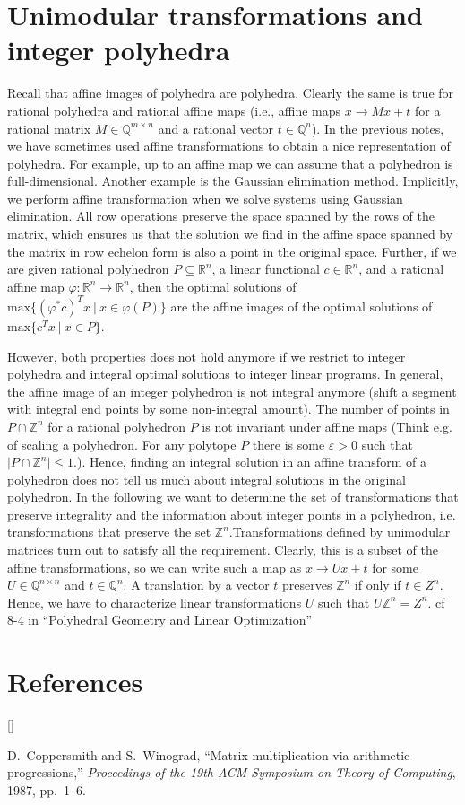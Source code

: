 \documentclass{article}
\def\beginrefs{\begin{list}%
        {[\arabic{equation}]}{\usecounter{equation}
         \setlength{\leftmargin}{2.0truecm}\setlength{\labelsep}{0.4truecm}%
         \setlength{\labelwidth}{1.6truecm}}}
\def\endrefs{\end{list}}
\def\bibentry#1{\item[\hbox{[#1]}]}
\def\R{{\mathbb R}}
\def\Q{{\mathbb Q}}
\def\Z{{\mathbb Z}}
\begin{document}
\section{Unimodular transformations and integer polyhedra}
Recall that affine images of polyhedra are polyhedra. Clearly the same is true for rational polyhedra and rational affine maps (i.e., affine maps $x\rightarrow Mx+t$ for a rational matrix $M\in\Q^{m\times n}$ and a rational vector $t\in \Q^n$). In the previous notes, we have sometimes used affine transformations to obtain a nice representation of polyhedra. For example, up to an affine map we can assume that a polyhedron is full-dimensional. Another example is the Gaussian elimination method. Implicitly, we perform affine transformation when we solve systems using Gaussian elimination. All row operations preserve the space spanned by the rows of the matrix, which ensures us that the solution we find in the affine space spanned by the matrix in row echelon form is also a point in the original space. Further, if we are given rational polyhedron $P\subseteq\R^n$, a linear functional $c\in \R^n$, and a rational affine map $\varphi:\R^n\rightarrow \R^n$, then the optimal solutions of $\mbox{max}\{(\varphi^* c)^T x~|~x\in \varphi(P)\}$ are the affine images of the optimal solutions of $\mbox{max}\{c^T x~|~x\in P\}$. 

However, both properties does not hold anymore if we restrict to integer polyhedra and 
integral optimal solutions to integer linear programs. In general, the affine image of an integer polyhedron is not integral anymore (shift a segment with integral end points by some non-integral amount). The number of points in $P\cap \Z^n$ for a rational polyhedron $P$ is not invariant under affine maps (Think e.g. of scaling a polyhedron. For any polytope $P$ there is some $\varepsilon>0$ such that $\lvert P\cap \Z^n \rvert\leqslant 1$.). Hence, finding an integral solution in an affine transform of a polyhedron does not tell us much about integral solutions in the original polyhedron. In the following we want to determine the set of transformations that preserve integrality and the information about integer points in a polyhedron, i.e. transformations that preserve the set $\Z^n$.Transformations defined by unimodular matrices turn out to satisfy all the requirement. Clearly, this is a subset of the affine transformations, so we can write such a map as $x\rightarrow Ux+t$ for some $U\in\Q^{n\times n}$ and $t\in \Q^n$. A translation by a vector $t$ preserves $\Z^n$ if only if $t\in Z^n$. Hence, we have to characterize linear transformations $U$ such that $U\Z^n=Z^n$.
cf 8-4 in ``Polyhedral Geometry and Linear Optimization''


\section*{References}
\beginrefs
\bibentry{CW87}{\sc D.~Coppersmith} and {\sc S.~Winograd},
``Matrix multiplication via arithmetic progressions,''
{\it Proceedings of the 19th ACM Symposium on Theory of Computing},
1987, pp.~1--6.
\endrefs

\end{document}
